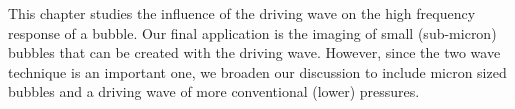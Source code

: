 














This chapter studies the influence of the driving wave on the high frequency response of a bubble.
Our final application is the imaging of small (sub-micron) bubbles that can be created 
with the driving wave.
However, 
since the two wave technique is an important one,
we broaden our discussion to include micron sized bubbles and  a driving wave of more conventional (lower) pressures. 

